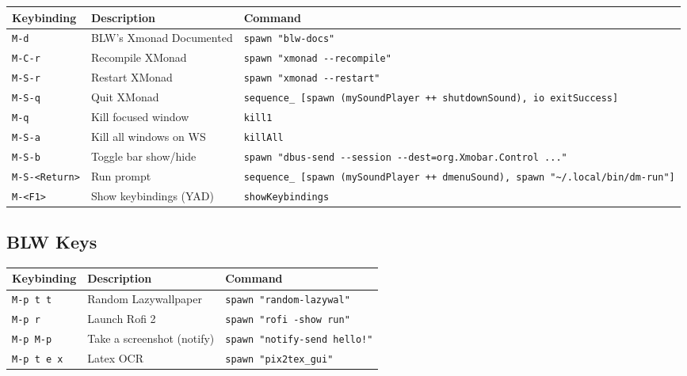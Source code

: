 \begin{longtable}[]{@{}
  >{\raggedright\arraybackslash}p{}
  >{\raggedright\arraybackslash}p{}
  >{\raggedright\arraybackslash}p{}@{}}
\toprule
Keybinding & Description & Command \\
\midrule
\endhead
\texttt{M-d} & BLW's Xmonad Documented & \texttt{spawn\ "blw-docs"} \\
\texttt{M-C-r} & Recompile XMonad &
\texttt{spawn\ "xmonad\ -\/-recompile"} \\
\texttt{M-S-r} & Restart XMonad &
\texttt{spawn\ "xmonad\ -\/-restart"} \\
\texttt{M-S-q} & Quit XMonad &
\texttt{sequence\_\ {[}spawn\ (mySoundPlayer\ ++\ shutdownSound),\ io\ exitSuccess{]}} \\
\texttt{M-q} & Kill focused window & \texttt{kill1} \\
\texttt{M-S-a} & Kill all windows on WS & \texttt{killAll} \\
\texttt{M-S-b} & Toggle bar show/hide &
\texttt{spawn\ "dbus-send\ -\/-session\ -\/-dest=org.Xmobar.Control\ ..."} \\
\texttt{M-S-\textless{}Return\textgreater{}} & Run prompt &
\texttt{sequence\_\ {[}spawn\ (mySoundPlayer\ ++\ dmenuSound),\ spawn\ "\textasciitilde{}/.local/bin/dm-run"{]}} \\
\texttt{M-\textless{}F1\textgreater{}} & Show keybindings (YAD) &
\texttt{showKeybindings} \\
\bottomrule
\end{longtable}

\hypertarget{blw-keys}{%
\subsection{BLW Keys}\label{blw-keys}}

\begin{longtable}[]{@{}lll@{}}
\toprule
Keybinding & Description & Command \\
\midrule
\endhead
\texttt{M-p\ t\ t} & Random Lazywallpaper &
\texttt{spawn\ "random-lazywal"} \\
\texttt{M-p\ r} & Launch Rofi 2 & \texttt{spawn\ "rofi\ -show\ run"} \\
\texttt{M-p\ M-p} & Take a screenshot (notify) &
\texttt{spawn\ "notify-send\ \textquotesingle{}hello!\textquotesingle{}"} \\
\texttt{M-p\ t\ e\ x} & Latex OCR & \texttt{spawn\ "pix2tex\_gui"} \\
\bottomrule
\end{longtable}

